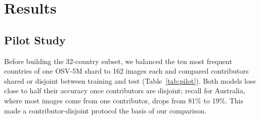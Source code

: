 \documentclass[clean,twocolumn]{bam-project}
\begin{document}
\section{Results}
\subsection{Pilot Study}\label{sec:pilot}
Before building the 32-country subset, we balanced the ten most frequent countries of one OSV-5M shard to
162 images each and compared contributors shared or disjoint between training and test
(Table~\ref{tab:pilot}). Both models lose close to half their accuracy once contributors are disjoint;
recall for Australia, where most images come from one contributor, drops from 81\% to 19\%. This made a
contributor-disjoint protocol the basis of our comparison.

\begin{table}[!t]
\centering\small
\caption{Pilot study: top-1 accuracy on ten balanced countries from one OSV-5M shard (chance 10\%; about $\pm5$ percentage points).}
\label{tab:pilot}
\end{table}
\end{document}
